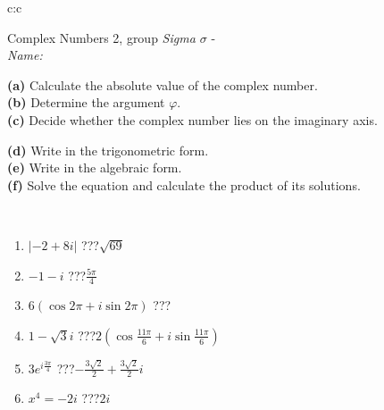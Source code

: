 \documentclass[10pt]{report}
\begin{document}
\newpage
\thispagestyle{empty}
\begin{tabular}{c:c}
\begin{minipage}[c][104.5mm][t]{0.5\linewidth}
\begin{center}
\vspace{5mm}
{\huge Complex Numbers 2, group \textit{Sigma $\sigma$} -}\\[5mm]
\textit{Name:}\phantom{xxxxxxxxxxxxxxxxxxxxxxxxxxxxxxxxxxxxxxxxxxxxxxxxxxxxxxxxxxxxxxxxx}\\[5mm]
\begin{minipage}{0.95\linewidth}
\begin{center}
{\small \begin{minipage}{0.44\textwidth} \raggedright
\textbf{(a)} Calculate the absolute value of the complex number. \\[1mm]
\textbf{(b)} Determine the argument \(\varphi\). \\[1mm]
\textbf{(c)} Decide whether the complex number lies on the imaginary axis. \end{minipage} \begin{minipage}{0.54\textwidth}
\textbf{(d)} Write in the trigonometric form. \\[1mm]
\textbf{(e)} Write in the algebraic form. \\[1mm]
\textbf{(f)} Solve the equation and calculate the product of its solutions.
\end{minipage}
}
\end{center}
\end{minipage}
\\[1mm]
\begin{minipage}{0.79\linewidth}
\begin{center}
\begin{varwidth}{\linewidth}
\setlength{\itemsep}{0pt}
\begin{enumerate}
\large
\item $|-2+8i|$\quad \dotfill\; ???\;\dotfill \quad $\sqrt{69}$
\item $-1-i$\quad \dotfill\; ???\;\dotfill \quad $\frac{5\pi}{4}$
\item $6\left(\cos{2\pi}+i\sin{2\pi}\right)$\quad \dotfill\; ???\;\dotfill \quad {}
\item $1-\sqrt{3}i$\quad \dotfill\; ???\;\dotfill \quad $2\left(\cos{\frac{11\pi}{6}}+i\sin{\frac{11\pi}{6}}\right)$
\item $3e^{i\frac{3\pi}{4}}$\quad \dotfill\; ???\;\dotfill \quad $-\frac{3\sqrt{2}}{2}+\frac{3\sqrt{2}}{2}i$
\item $x^4=-2i$\quad \dotfill\; ???\;\dotfill \quad $2i$

\end{enumerate}
\end{varwidth}
\end{center}
\end{minipage}
\end{center}
\end{minipage}
\end{tabular}
\end{document}
